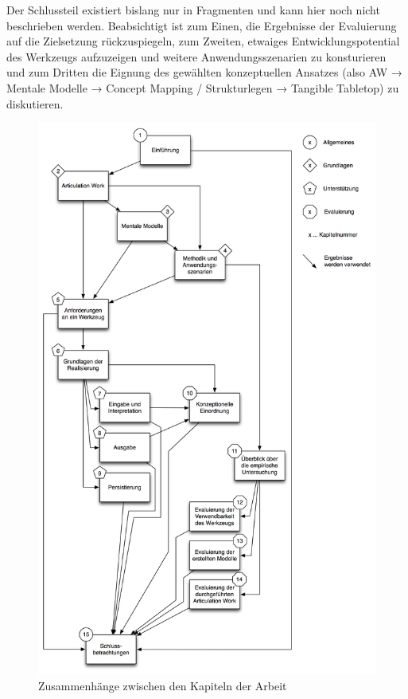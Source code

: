\todo Der Schlussteil existiert bislang nur in Fragmenten und kann hier noch nicht beschrieben werden. Beabsichtigt ist zum Einen, die Ergebnisse der Evaluierung auf die Zielsetzung rückzuspiegeln, zum Zweiten, etwaiges Entwicklungspotential des Werkzeugs aufzuzeigen und weitere Anwendungsszenarien zu konsturieren und zum Dritten die Eignung des gewählten konzeptuellen Ansatzes (also AW → Mentale Modelle → Concept Mapping / Strukturlegen → Tangible Tabletop) zu diskutieren.

\begin{figure}[htbp]
	\centering
		\includegraphics[scale=0.5]{img/Einfuehrung/gesamtueberblick.png}
	\caption{Zusammenhänge zwischen den Kapiteln der Arbeit}
	\label{fig:img_Einfuehrung_gesamtueberblick}
\end{figure}


